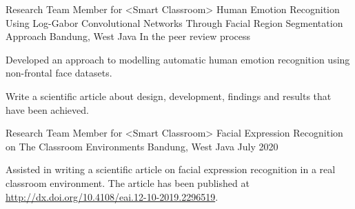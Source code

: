 


\begin{cventries}


\cventry
{Research Team Member for <Smart Classroom>} %
{Human Emotion Recognition Using Log-Gabor Convolutional Networks Through Facial Region Segmentation Approach} %
{Bandung, West Java} %
{In the peer review process} %
{ %
\begin{cvitems}
    \item {Developed an approach to modelling automatic human emotion recognition using non-frontal face datasets.}
    \item {Write a scientific article about design, development, findings and results that have been achieved.}
\end{cvitems}
}


\cventry
{Research Team Member for <Smart Classroom>} %
{Facial Expression Recognition on The Classroom Environments} %
{Bandung, West Java} %
{July 2020} %
{ %
\begin{cvitems}
\item {Assisted in writing a scientific article on facial expression recognition in a real classroom environment. The article has been published at \href{http://dx.doi.org/10.4108/eai.12-10-2019.2296519}{http://dx.doi.org/10.4108/eai.12-10-2019.2296519}.}
\end{cvitems}
}


\end{cventries}
